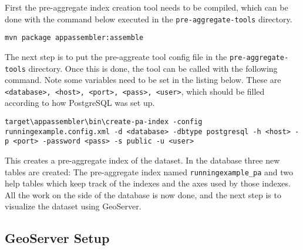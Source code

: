 First the pre-aggregate index creation tool needs to be compiled, which can
be done with the command below executed in the
\lstinline|pre-aggregate-tools| directory.
\begin{lstlisting}
mvn package appassembler:assemble
\end{lstlisting}
The next step is to put the pre-aggreate tool config file in the
\lstinline|pre-aggregate-tools| directory. Once this is done, the tool can
be called with the following command. Note some variables need to be set
in the listing below. These are
\lstinline|<database>, <host>, <port>, <pass>, <user>|,
which should be filled according to how PostgreSQL was
set up.
\begin{lstlisting}
target\appassembler\bin\create-pa-index -config runningexample.config.xml -d <database> -dbtype postgresql -h <host> -p <port> -password <pass> -s public -u <user>
\end{lstlisting}
This creates a pre-aggregate index of the dataset. In the database
three new tables are created: The pre-aggregate index named
\lstinline|runningexample_pa| and two help tables which keep track of the
indexes and the axes used by those indexes. All the work on the side of the
database is now done, and the next step is to visualize the dataset using
GeoServer.

\subsection{GeoServer Setup}
\label{sec:exampleGeoServer}

